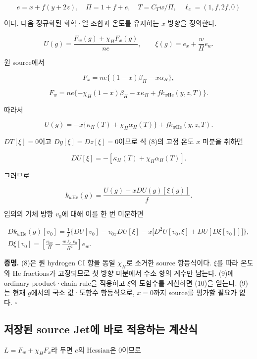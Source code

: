 \[
e=x+f(y+2z),\quad \Pi=1+f+e,\quad T=C_Tw/\Pi,\quad
\ell_e=(1,f,2f,0)
\]

이다. 다음 정규화된 화학·열 조합과 온도를 유지하는 \(x\) 방향을 정의한다.

\[
U(g)=\frac{F_w(g)+\chi_HF_x(g)}{ne},\qquad
\xi(g)=e_x+\frac{w}{\Pi}e_w.
\tag{7}
\]

원 source에서

\[
F_x=ne\{(1-x)\beta_H-x\alpha_H\},
\]

\[
F_w=ne\{-\chi_H(1-x)\beta_H-x\kappa_H
+f k_{w\mathrm{He}}(y,z,T)\}.
\]

따라서

\[
U(g)=-x\{\kappa_H(T)+\chi_H\alpha_H(T)\}
+f k_{w\mathrm{He}}(y,z,T).
\tag{8}
\]

\(DT[\xi]=0\)이고 \(Dy[\xi]=Dz[\xi]=0\)이므로 식 (8)의 고정 온도 \(x\) 미분을 취하면

\[
DU[\xi]=-[\kappa_H(T)+\chi_H\alpha_H(T)].
\]

그러므로

\[
\boxed{k_{w\mathrm{He}}(g)=\frac{U(g)-xDU(g)[\xi(g)]}{f}.}
\tag{9}
\]

임의의 기체 방향 \(v_0\)에 대해 이를 한 번 미분하면

\[
\boxed{\begin{aligned}
Dk_{w\mathrm{He}}(g)[v_0]
=\frac{1}{f}\bigg\{
DU[v_0]-v_{0x}DU[\xi]
-x\big[D^2U[v_0,\xi]+DU[D\xi[v_0]]\big]\bigg\},\\
D\xi[v_0]=\left[\frac{v_{0w}}{\Pi}
-\frac{w\ell_ev_0}{\Pi^2}\right]e_w.
\end{aligned}}
\tag{10}
\]

\textbf{증명.} (8)은 원 hydrogen CI 항을 동일 \(\chi_H\)로 소거한 source 항등식이다. \(\xi\)를 따라 온도와 He fractions가 고정되므로 첫 방향 미분에서 수소 항의 계수만 남는다. (9)에 ordinary product·chain rule을 적용하고 \(\xi\)의 도함수를 계산하면 (10)을 얻는다. (9)는 현재 \(g\)에서의 국소 값·도함수 항등식으로, \(x=0\)까지 source를 평가할 필요가 없다. \(\square\)

\hypertarget{uxc800uxc7a5uxb41c-source-jetuxc5d0-uxbc14uxb85c-uxc801uxc6a9uxd558uxb294-uxacc4uxc0b0uxc2dd}{%
\subsection{저장된 source Jet에 바로 적용하는 계산식}\label{uxc800uxc7a5uxb41c-source-jetuxc5d0-uxbc14uxb85c-uxc801uxc6a9uxd558uxb294-uxacc4uxc0b0uxc2dd}}

\(L=F_w+\chi_HF_x\)라 두면 \(e\)의 Hessian은 0이므로

